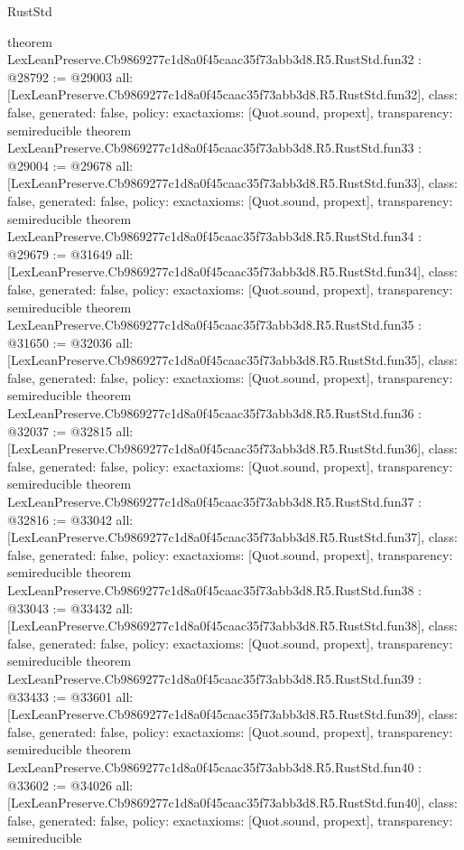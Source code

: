 \begin{lexlean}{RustStd}
\begin{coremodule}
{}
theorem LexLeanPreserve.Cb9869277c1d8a0f45caac35f73abb3d8.R5.RustStd.fun32 : @28792 := @29003 {
  all: [LexLeanPreserve.Cb9869277c1d8a0f45caac35f73abb3d8.R5.RustStd.fun32],
  class: false,
  generated: false,
  policy: exact{axioms: [Quot.sound, propext]},
  transparency: semireducible
}
theorem LexLeanPreserve.Cb9869277c1d8a0f45caac35f73abb3d8.R5.RustStd.fun33 : @29004 := @29678 {
  all: [LexLeanPreserve.Cb9869277c1d8a0f45caac35f73abb3d8.R5.RustStd.fun33],
  class: false,
  generated: false,
  policy: exact{axioms: [Quot.sound, propext]},
  transparency: semireducible
}
theorem LexLeanPreserve.Cb9869277c1d8a0f45caac35f73abb3d8.R5.RustStd.fun34 : @29679 := @31649 {
  all: [LexLeanPreserve.Cb9869277c1d8a0f45caac35f73abb3d8.R5.RustStd.fun34],
  class: false,
  generated: false,
  policy: exact{axioms: [Quot.sound, propext]},
  transparency: semireducible
}
theorem LexLeanPreserve.Cb9869277c1d8a0f45caac35f73abb3d8.R5.RustStd.fun35 : @31650 := @32036 {
  all: [LexLeanPreserve.Cb9869277c1d8a0f45caac35f73abb3d8.R5.RustStd.fun35],
  class: false,
  generated: false,
  policy: exact{axioms: [Quot.sound, propext]},
  transparency: semireducible
}
theorem LexLeanPreserve.Cb9869277c1d8a0f45caac35f73abb3d8.R5.RustStd.fun36 : @32037 := @32815 {
  all: [LexLeanPreserve.Cb9869277c1d8a0f45caac35f73abb3d8.R5.RustStd.fun36],
  class: false,
  generated: false,
  policy: exact{axioms: [Quot.sound, propext]},
  transparency: semireducible
}
theorem LexLeanPreserve.Cb9869277c1d8a0f45caac35f73abb3d8.R5.RustStd.fun37 : @32816 := @33042 {
  all: [LexLeanPreserve.Cb9869277c1d8a0f45caac35f73abb3d8.R5.RustStd.fun37],
  class: false,
  generated: false,
  policy: exact{axioms: [Quot.sound, propext]},
  transparency: semireducible
}
theorem LexLeanPreserve.Cb9869277c1d8a0f45caac35f73abb3d8.R5.RustStd.fun38 : @33043 := @33432 {
  all: [LexLeanPreserve.Cb9869277c1d8a0f45caac35f73abb3d8.R5.RustStd.fun38],
  class: false,
  generated: false,
  policy: exact{axioms: [Quot.sound, propext]},
  transparency: semireducible
}
theorem LexLeanPreserve.Cb9869277c1d8a0f45caac35f73abb3d8.R5.RustStd.fun39 : @33433 := @33601 {
  all: [LexLeanPreserve.Cb9869277c1d8a0f45caac35f73abb3d8.R5.RustStd.fun39],
  class: false,
  generated: false,
  policy: exact{axioms: [Quot.sound, propext]},
  transparency: semireducible
}
theorem LexLeanPreserve.Cb9869277c1d8a0f45caac35f73abb3d8.R5.RustStd.fun40 : @33602 := @34026 {
  all: [LexLeanPreserve.Cb9869277c1d8a0f45caac35f73abb3d8.R5.RustStd.fun40],
  class: false,
  generated: false,
  policy: exact{axioms: [Quot.sound, propext]},
  transparency: semireducible
}
\end{coremodule}
\end{lexlean}
